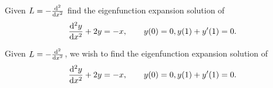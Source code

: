 \documentclass[12pt]{report}
\begin{document}
\newpage



\begin{problem}
    Given $L = -\frac{\mathrm{d}^{2} }{\mathrm{d} x^{2}}$ find the eigenfunction expansion solution of 
    \[ 
        \frac{\mathrm{d}^{2} y}{\mathrm{d} x^{2}} + 2y = -x, ~~~~~~ y(0) = 0, y(1) + y'(1) = 0.
    \]
\end{problem}

\begin{solution}

    \noindent
    Given $L = -\frac{\mathrm{d}^{2} }{\mathrm{d} x^{2}}$, we wish to find the eigenfunction expansion solution of 
    \begin{equation}\label{p3}
        \frac{\mathrm{d}^{2} y}{\mathrm{d} x^{2}} + 2y = -x, ~~~~~~ y(0) = 0, y(1) + y'(1) = 0.
    \end{equation} 


\end{solution}
\end{document}
